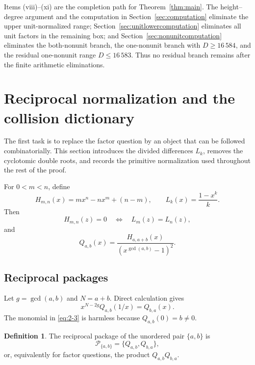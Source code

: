 \documentclass[11pt]{article}
\numberwithin{equation}{section}
\theoremstyle{definition}
\newtheorem{definition}[theorem]{Definition}
\newcommand{\Package}{\mathcal P}
\begin{document}
Items (viii)--(xi) are the completion path for Theorem~\ref{thm:main}.  The
height--degree argument and the computation in Section~\ref{sec:computation}
eliminate the upper unit-normalized range; Section~\ref{sec:unitlowercomputation}
eliminates all unit factors in the remaining box; and
Section~\ref{sec:nonunitcomputation} eliminates the both-nonunit branch, the
one-nonunit branch with \(D\geq16\,584\), and the residual
one-nonunit range \(D\leq16\,583\).  Thus no residual branch remains after the
finite arithmetic eliminations.

\section{Reciprocal normalization and the collision dictionary}
\label{sec:dictionary}

The first task is to replace the factor question by an object that can be followed combinatorially.  This section introduces the divided differences \(L_k\), removes the cyclotomic double roots, and records the primitive normalization used throughout the rest of the proof.

For \(0<m<n\), define
\[
 H_{m,n}(x)=mx^n-nx^m+(n-m),
 \qquad
 L_k(x)=\frac{1-x^k}{k}.
\]
Then
\begin{equation}
 H_{m,n}(z)=0
 \quad\Longleftrightarrow\quad
 L_m(z)=L_n(z),
 \label{eq:2-1}
\end{equation}
and
\begin{equation}
 Q_{a,b}(x)=
 \frac{H_{a,a+b}(x)}{(x^{\gcd(a,b)}-1)^2}.
 \label{eq:2-2}
\end{equation}

\subsection{Reciprocal packages}

Let \(g=\gcd(a,b)\) and \(N=a+b\).  Direct calculation gives
\begin{equation}
 x^{N-2g}Q_{a,b}(1/x)=Q_{b,a}(x).
 \label{eq:2-3}
\end{equation}
The monomial in \eqref{eq:2-3} is harmless because \(Q_{a,b}(0)=b\neq0\).

\begin{definition}
The reciprocal package of the unordered pair \(\{a,b\}\) is
\[
 \Package_{\{a,b\}}=\{Q_{a,b},Q_{b,a}\},
\]
or, equivalently for factor questions, the product \(Q_{a,b}Q_{b,a}\).
\end{definition}
\end{document}
